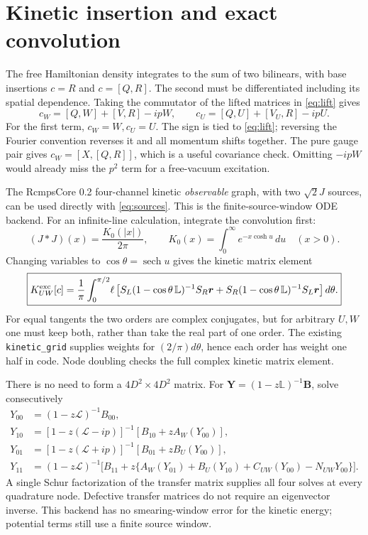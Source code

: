 \documentclass[11pt]{article}
\newcommand{\LL}{\mathcal{L}}
\begin{document}
\section{Kinetic insertion and exact convolution}
The free Hamiltonian density integrates to the sum of two bilinears, with
base insertions $c=R$ and $c=[Q,R]$. The second must be differentiated
including its spatial dependence. Taking the commutator of the lifted
matrices in \eqref{eq:lift} gives
\begin{equation}
 \boxed{c_W=[Q,W]+[V,R]-ipW,\qquad
        c_U=[Q,U]+[V_U,R]-ipU.}
 \label{eq:kinetic}
\end{equation}
For the first term, $c_W=W,c_U=U$. The sign is tied to
\eqref{eq:lift}; reversing the Fourier convention reverses it and all
momentum shifts together. The pure gauge pair gives
$c_W=[X,[Q,R]]$, which is a useful covariance check. Omitting $-ipW$
would already miss the $p^2$ term for a free-vacuum excitation.

The RcmpsCore 0.2 four-channel kinetic \emph{observable} graph, with two
$\sqrt2J$ sources, can be used directly with \eqref{eq:sources}. This is the
finite-source-window ODE backend. For an infinite-line calculation,
integrate the convolution first:
\begin{equation}
 (J*J)(x)=\frac{K_0(|x|)}{2\pi},\qquad
 K_0(x)=\int_0^\infty e^{-x\cosh u}\,du\quad(x>0).
\end{equation}
Changing variables to $\cos\theta=\operatorname{sech}u$ gives the kinetic
matrix element
\begin{equation}
 \boxed{K^{\rm exc}_{UW}[c]=\frac1\pi\int_0^{\pi/2}\!
 \ell\left[
 S_L(1-\cos\theta\,\mathbb L)^{-1}S_R\bm r+
 S_R(1-\cos\theta\,\mathbb L)^{-1}S_L\bm r
 \right]d\theta.}
 \label{eq:kinetic-resolvent}
\end{equation}
For equal tangents the two orders are complex conjugates, but for arbitrary
$U,W$ one must keep both, rather than take the real part of one order.
The existing \texttt{kinetic\_grid} supplies weights for
$(2/\pi)d\theta$, hence each order has weight one half in code.
Node doubling checks the full complex kinetic matrix element.

There is no need to form a $4D^2\times4D^2$ matrix. For
$\bm Y=(1-z\mathbb L)^{-1}\bm B$, solve consecutively
\begin{align}
 Y_{00}&=(1-z\LL)^{-1}B_{00},\\
 Y_{10}&=[1-z(\LL-ip)]^{-1}[B_{10}+zA_W(Y_{00})],\\
 Y_{01}&=[1-z(\LL+ip)]^{-1}[B_{01}+zB_U(Y_{00})],\\
 Y_{11}&=(1-z\LL)^{-1}\bigl[B_{11}+z\{A_W(Y_{01})+B_U(Y_{10})
                         +C_{UW}(Y_{00})-N_{UW}Y_{00}\}\bigr].
\end{align}
A single Schur factorization of the transfer matrix supplies all
four solves at every quadrature node. Defective transfer matrices do not
require an eigenvector inverse. This backend has no smearing-window error
for the kinetic energy; potential terms still use a finite source window.
\end{document}
